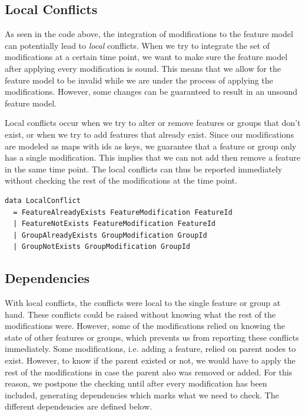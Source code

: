 \documentclass[a4paper,english]{ifimaster}
\begin{document}
\subsection{Local Conflicts}%
\label{sub:local_conflicts}

As seen in the code above, the integration of modifications to the feature model can potentially lead to \textit{local} conflicts. When we try to integrate the set of modifications at a certain time point, we want to make sure the feature model after applying every modification is sound. This means that we allow for the feature model to be invalid while we are under the process of applying the modifications. However, some changes can be guaranteed to result in an unsound feature model.

Local conflicts occur when we try to alter or remove features or groups that don't exist, or when we try to add features that already exist. Since our modifications are modeled as maps with ids as keys, we guarantee that a feature or group only has a single modification. This implies that we can not add then remove a feature in the same time point. The local conflicts can thus be reported immediately without checking the rest of the modifications at the time point.

\begin{verbatim}
data LocalConflict
  = FeatureAlreadyExists FeatureModification FeatureId
  | FeatureNotExists FeatureModification FeatureId
  | GroupAlreadyExists GroupModification GroupId
  | GroupNotExists GroupModification GroupId
\end{verbatim}

\subsection{Dependencies}%
\label{sub:dependencies}

With local conflicts, the conflicts were local to the single feature or group at hand. These conflicts could be raised without knowing what the rest of the modifications were. However, some of the modifications relied on knowing the state of other features or groups, which prevents us from reporting these conflicts immediately. Some modifications, i.e. adding a feature, relied on parent nodes to exist. However, to know if the parent existed or not, we would have to apply the rest of the modifications in case the parent also was removed or added. For this reason, we postpone the checking until after every modification has been included, generating dependencies which marks what we need to check. The different dependencies are defined below.
\end{document}
